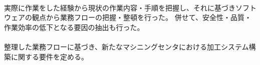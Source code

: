 {\paragraph*{\tpartconclusion}
実際に作業をした経験から現状の作業内容・手順を把握し、それに基づきソフトウェアの観点から業務フローの把握・整頓を行った。
併せて、安全性・品質・作業効率の低下となる要因の抽出も行った。
\tcbline*
\paragraph*{\tpartnextstep}
整理した業務フローに基づき、新たなマシニングセンタにおける加工システム構築に関する要件を定める。
}





\begin{appendices}
\end{appendices}


